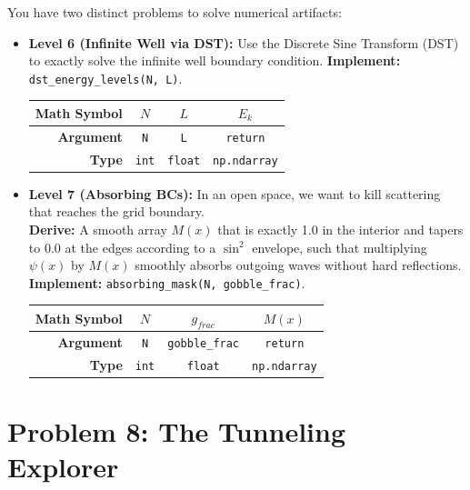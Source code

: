 \documentclass[11pt]{article}
\begin{document}
You have two distinct problems to solve numerical artifacts:
\begin{itemize}
    \item \textbf{Level 6 (Infinite Well via DST):} Use the Discrete Sine Transform (DST) to exactly solve the infinite well boundary condition. \textbf{Implement:} \lstinline|dst_energy_levels(N, L)|.
    
\begin{center}
\renewcommand{\arraystretch}{2.0}
\begin{tabular}{r | c | c | c}
\toprule
\textbf{Math Symbol} & $N$ & $L$ & $E_k$ \\
\midrule
\textbf{Argument} & \lstinline|N| & \lstinline|L| & \lstinline|return| \\
\midrule
\textbf{Type} & \lstinline|int| & \lstinline|float| & \lstinline|np.ndarray| \\
\bottomrule
\end{tabular}
\end{center}
    
    \item \textbf{Level 7 (Absorbing BCs):} In an open space, we want to kill scattering that reaches the grid boundary. \\
    \textbf{Derive:} A smooth array $M(x)$ that is exactly 1.0 in the interior and tapers to 0.0 at the edges according to a $\sin^2$ envelope, such that multiplying $\psi(x)$ by $M(x)$ smoothly absorbs outgoing waves without hard reflections. \\
    \textbf{Implement:} \lstinline|absorbing_mask(N, gobble_frac)|.
    
\begin{center}
\renewcommand{\arraystretch}{2.0}
\begin{tabular}{r | c | c | c}
\toprule
\textbf{Math Symbol} & $N$ & $g_{frac}$ & $M(x)$ \\
\midrule
\textbf{Argument} & \lstinline|N| & \lstinline|gobble_frac| & \lstinline|return| \\
\midrule
\textbf{Type} & \lstinline|int| & \lstinline|float| & \lstinline|np.ndarray| \\
\bottomrule
\end{tabular}
\end{center}
\end{itemize}


\section*{Problem 8: The Tunneling Explorer}
\end{document}
